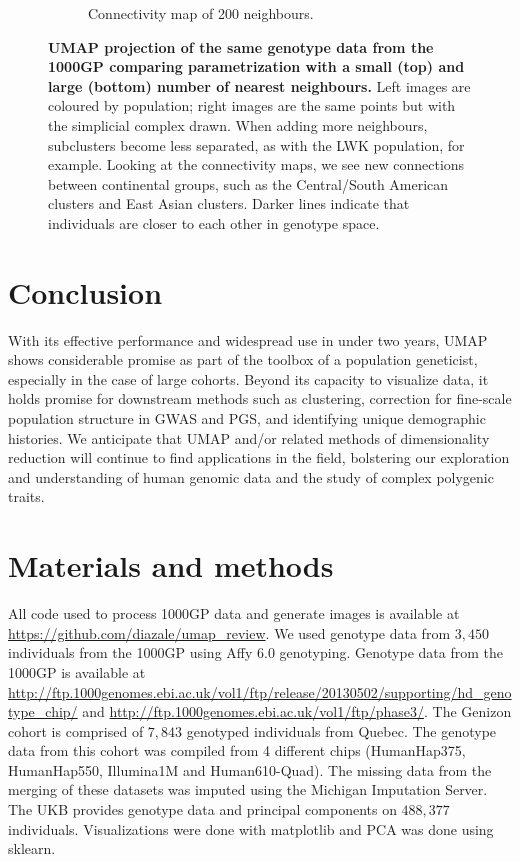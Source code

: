 \begin{figure}[h!]
\begin{subfigure}[b]{0.4\linewidth}
    \caption{Connectivity map of 200 neighbours.}
    \label{fig:UMAP_high_NN_connectivity}
  \end{subfigure}
  \caption[UMAP parametrization changes the connectivity of points]{\textbf{UMAP projection of the same genotype data from the 1000GP comparing parametrization with a small (top) and large (bottom) number of nearest neighbours.} Left images are coloured by population; right images are the same points but with the simplicial complex drawn. When adding more neighbours, subclusters become less separated, as with the LWK population, for example. Looking at the connectivity maps, we see new connections between continental groups, such as the Central/South American clusters and East Asian clusters. Darker lines indicate that individuals are closer to each other in genotype space.}
  \label{fig:UMAP_connectivity}
\end{figure}

\clearpage

\section{Conclusion}
With its effective performance and widespread use in under two years, UMAP shows considerable promise as part of the toolbox of a population geneticist, especially in the case of large cohorts. Beyond its capacity to visualize data, it holds promise for downstream methods such as clustering, correction for fine-scale population structure in GWAS and PGS, and identifying unique demographic histories. We anticipate that UMAP and/or related methods of dimensionality reduction will continue to find applications in the field, bolstering our exploration and understanding of human genomic data and the study of complex polygenic traits.

\section{Materials and methods}
All code used to process 1000GP data and generate images is available at \url{https://github.com/diazale/umap_review}. We used genotype data from $3,450$ individuals from the 1000GP using Affy 6.0 genotyping\citep{global_2015}. Genotype data from the 1000GP is available at \url{http://ftp.1000genomes.ebi.ac.uk/vol1/ftp/release/20130502/supporting/hd_genotype_chip/} and \url{http://ftp.1000genomes.ebi.ac.uk/vol1/ftp/phase3/}. The Genizon cohort is comprised of $7,843$ genotyped individuals from Quebec. The genotype data from this cohort was compiled from 4 different chips (HumanHap375, HumanHap550, Illumina1M and Human610-Quad). The missing data from the merging of these datasets was imputed using the Michigan Imputation Server.  The UKB provides genotype data and principal components on $488,377$ individuals. Visualizations were done with matplotlib\citep{Hunter2007} and PCA was done using sklearn\citep{scikit-learn}. 
